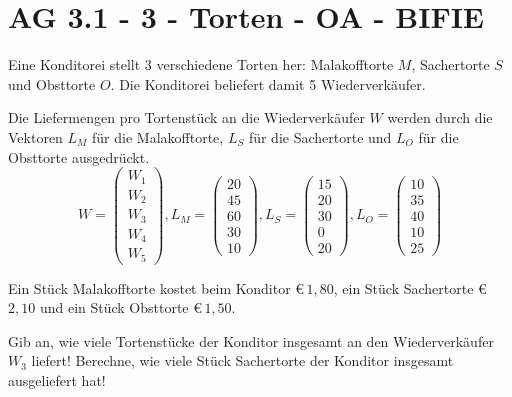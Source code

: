 \section{AG 3.1 - 3 - Torten - OA - BIFIE}

\begin{beispiel}[AG 3.1]{1} %
Eine Konditorei stellt 3 verschiedene Torten her: Malakofftorte $M$, Sachertorte $S$ und Obsttorte $O$. Die Konditorei beliefert damit 5 Wiederverkäufer.

Die Liefermengen pro Tortenstück an die Wiederverkäufer $W$ werden durch die Vektoren $L_{M}$ für die Malakofftorte, $L_{S}$ für die Sachertorte und $L_{O}$ für die Obsttorte ausgedrückt.
\[W=\left(\begin{array}{r}W_1\\W_2\\W_3\\W_4\\W_5\end{array}\right), L_{M}=\left(\begin{array}{r}20\\45\\60\\30\\10\end{array}\right), L_{S}=\left(\begin{array}{r}15\\20\\30\\0\\20\end{array}\right), L_{O}=\left(\begin{array}{r}10\\35\\40\\10\\25\end{array}\right)\]

Ein Stück Malakofftorte kostet beim Konditor \euro\,$1,80$, ein Stück Sachertorte \euro\,$2,10$ und ein Stück Obsttorte \euro\,$1,50$.

Gib an, wie viele Tortenstücke der Konditor insgesamt an den Wiederverkäufer $W_{3}$ liefert! Berechne, wie viele Stück Sachertorte der Konditor insgesamt ausgeliefert hat!

\end{beispiel}